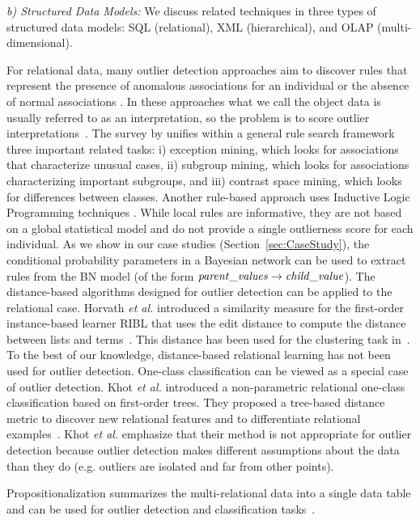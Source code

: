 {				\textit{b) Structured Data Models:} We discuss related techniques in three types of structured data models: SQL (relational), XML (hierarchical), and OLAP (multi-dimensional). 
				
				For relational data, many outlier detection approaches aim to discover rules that represent the presence of anomalous associations for an individual or the absence of normal associations \citep{Maervoet2012,Gao2010}.    In these approaches what we call the object data is usually referred to as an interpretation, so the problem is to score outlier interpretations~\citep{Maervoet2012}. The survey by \citep{Novak2009} unifies within a general rule search framework three important related tasks: i) exception mining, which looks for associations that characterize unusual cases, ii) subgroup mining, which looks for associations  characterizing important subgroups, and iii) contrast space mining, which looks for differences between classes. Another rule-based approach uses Inductive Logic Programming techniques \citep{Angiulli2007}.
				While local rules are informative, they are not based on a global statistical model and do not provide a single outlierness score for each individual. As we show in our case studies (Section~\ref{sec:CaseStudy}), the conditional probability parameters in a Bayesian network can be used to extract rules  from the BN model (of the form $\it{parent\_values} \rightarrow \it{child\_value}$).
				The distance-based algorithms designed for outlier detection can be applied to the relational case.  Horvath {\em et al.} introduced a similarity measure for the first-order instance-based learner RIBL that uses the edit distance to compute the distance between lists and terms~\citep{Horvath2001}. This distance has been used for the clustering task in~\citep{Kirsten2001}. To the best of our knowledge, distance-based relational learning has not been used for outlier detection. One-class classification can be viewed as a special case of outlier detection.  Khot {\em et al.} introduced a non-parametric relational one-class classification based on first-order trees. They proposed a tree-based distance metric to discover new relational features and to differentiate relational examples~\citep{Khot2014}. Khot {\em et al.} emphasize that their method is not appropriate for outlier detection because outlier detection makes different assumptions about the data than they do (e.g. outliers are isolated and far from other points).  
				
				 Propositionalization summarizes the multi-relational data into a single data table and can be used for outlier detection and classification tasks~\citep{Kramer2000,Lavrac13,kuzelka2008,Riahi2016,AndersonP08}. 
				
}
